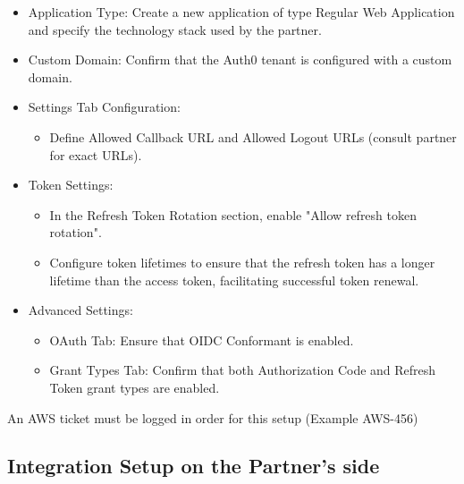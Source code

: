 \documentclass[11pt]{article}
\begin{document}
\begin{itemize}
    \item Application Type: Create a new application of type Regular Web Application and specify the technology stack used by the partner.
    \item Custom Domain: Confirm that the Auth0 tenant is configured with a custom domain.
    \item Settings Tab Configuration:
    \begin{itemize}
        \item Define Allowed Callback URL and Allowed Logout URLs (consult partner for exact URLs).
    \end{itemize}
    \item Token Settings:
    \begin{itemize}
        \item In the Refresh Token Rotation section, enable "Allow refresh token rotation".
    \end{itemize}
    \begin{itemize}
        \item Configure token lifetimes to ensure that the refresh token has a longer lifetime than the access token, facilitating successful token renewal.
    \end{itemize}
    \item Advanced Settings:
    \begin{itemize}
        \item OAuth Tab: Ensure that OIDC Conformant is enabled.
    \end{itemize}
    \begin{itemize}
        \item Grant Types Tab: Confirm that both Authorization Code and Refresh Token grant types are enabled.
    \end{itemize}
\end{itemize}

An AWS ticket must be logged in order for this setup (Example AWS-456)

\subsection{Integration Setup on the Partner's side}
\end{document}
